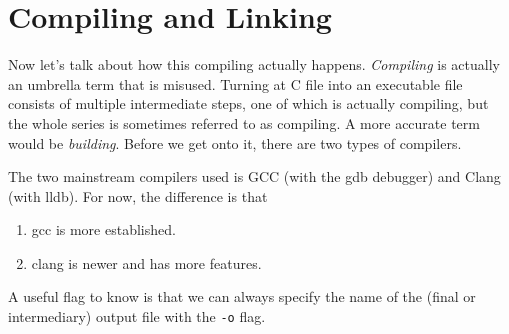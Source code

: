 \section{Compiling and Linking}

  Now let's talk about how this compiling actually happens. \textit{Compiling} is actually an umbrella term that is misused. Turning at C file into an executable file consists of multiple intermediate steps, one of which is actually compiling, but the whole series is sometimes referred to as compiling. A more accurate term would be \textit{building}. Before we get onto it, there are two types of compilers. 

  \begin{definition}
    The two mainstream compilers used is GCC (with the gdb debugger) and Clang (with lldb). For now, the difference is that 
    \begin{enumerate}
      \item gcc is more established. 
      \item clang is newer and has more features. 
    \end{enumerate}
    A useful flag to know is that we can always specify the name of the (final or intermediary) output file with the \texttt{-o} flag. 
  \end{definition}

